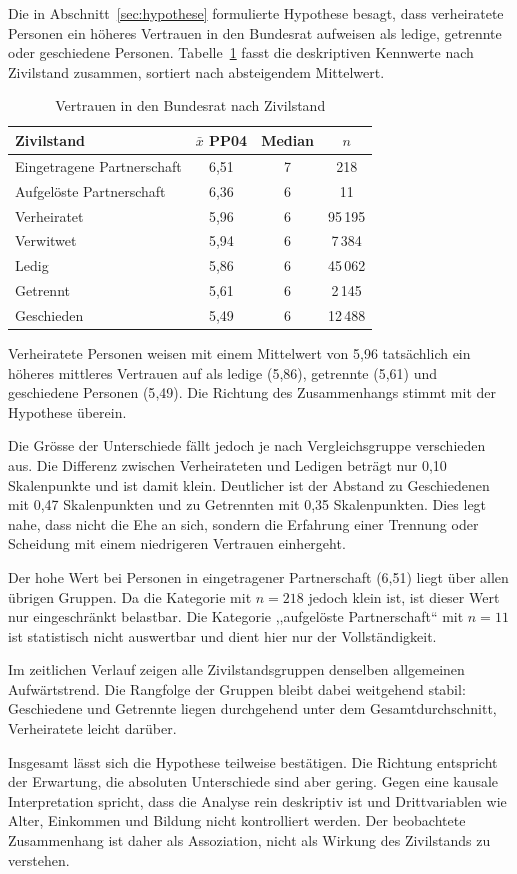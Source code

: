 Die in Abschnitt~\ref{sec:hypothese} formulierte Hypothese besagt, dass verheiratete
Personen ein höheres Vertrauen in den Bundesrat aufweisen als ledige, getrennte oder
geschiedene Personen. Tabelle~\ref{tab:vertrauen_zivilstand} fasst die deskriptiven
Kennwerte nach Zivilstand zusammen, sortiert nach absteigendem Mittelwert.

\begin{table}[h]
\centering
\caption{Vertrauen in den Bundesrat nach Zivilstand}
\label{tab:vertrauen_zivilstand}
\begin{tabular}{lccc}
\toprule
Zivilstand & $\bar{x}$ PP04 & Median & $n$ \\
\midrule
Eingetragene Partnerschaft & 6{,}51 & 7 &     218 \\
Aufgelöste Partnerschaft   & 6{,}36 & 6 &      11 \\
Verheiratet                & 5{,}96 & 6 & 95\,195 \\
Verwitwet                  & 5{,}94 & 6 &  7\,384 \\
Ledig                      & 5{,}86 & 6 & 45\,062 \\
Getrennt                   & 5{,}61 & 6 &  2\,145 \\
Geschieden                 & 5{,}49 & 6 & 12\,488 \\
\bottomrule
\end{tabular}
\end{table}

Verheiratete Personen weisen mit einem Mittelwert von 5{,}96 tatsächlich ein höheres
mittleres Vertrauen auf als ledige (5{,}86), getrennte (5{,}61) und geschiedene
Personen (5{,}49). Die Richtung des Zusammenhangs stimmt mit der Hypothese überein.

Die Grösse der Unterschiede fällt jedoch je nach Vergleichsgruppe verschieden aus. Die
Differenz zwischen Verheirateten und Ledigen beträgt nur 0{,}10 Skalenpunkte und ist
damit klein. Deutlicher ist der Abstand zu Geschiedenen mit 0{,}47 Skalenpunkten und
zu Getrennten mit 0{,}35 Skalenpunkten. Dies legt nahe, dass nicht die Ehe an sich,
sondern die Erfahrung einer Trennung oder Scheidung mit einem niedrigeren Vertrauen
einhergeht.

Der hohe Wert bei Personen in eingetragener Partnerschaft (6{,}51) liegt über allen
übrigen Gruppen. Da die Kategorie mit $n = 218$ jedoch klein ist, ist dieser Wert nur
eingeschränkt belastbar. Die Kategorie ,,aufgelöste Partnerschaft`` mit $n = 11$ ist
statistisch nicht auswertbar und dient hier nur der Vollständigkeit.

Im zeitlichen Verlauf zeigen alle Zivilstandsgruppen denselben allgemeinen
Aufwärtstrend. Die Rangfolge der Gruppen bleibt dabei weitgehend stabil: Geschiedene
und Getrennte liegen durchgehend unter dem Gesamtdurchschnitt, Verheiratete leicht
darüber.

Insgesamt lässt sich die Hypothese teilweise bestätigen. Die Richtung entspricht der
Erwartung, die absoluten Unterschiede sind aber gering. Gegen eine kausale Interpretation
spricht, dass die Analyse rein deskriptiv ist und Drittvariablen wie Alter, Einkommen
und Bildung nicht kontrolliert werden. Der beobachtete Zusammenhang ist daher als
Assoziation, nicht als Wirkung des Zivilstands zu verstehen.

